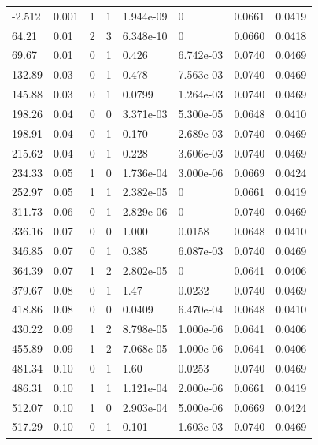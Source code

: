 \documentclass[preview]{standalone}
\begin{document}
{{\begin{tabular}{L{1.2cm}C{1.2cm} C{0.3cm}C{0.5cm} C{1.4cm}C{1.4cm} C{1.4cm}C{1.4cm}}
  -2.512  &  0.001  & 1     &  1 &  1.944e-09  & 0  & 0.0661 &  0.0419   \\ 
  64.21  &  0.01  & 2     &  3 &  6.348e-10  & 0  & 0.0660 &  0.0418   \\ 
  69.67  &  0.01  & 0     &  1 &  0.426  & 6.742e-03  & 0.0740 &  0.0469   \\ 
  132.89  &  0.03  & 0     &  1 &  0.478  & 7.563e-03  & 0.0740 &  0.0469   \\ 
  145.88  &  0.03  & 0     &  1 &  0.0799  & 1.264e-03  & 0.0740 &  0.0469   \\ 
  198.26  &  0.04  & 0     &  0 &  3.371e-03  & 5.300e-05  & 0.0648 &  0.0410   \\ 
  198.91  &  0.04  & 0     &  1 &  0.170  & 2.689e-03  & 0.0740 &  0.0469   \\ 
  215.62  &  0.04  & 0     &  1 &  0.228  & 3.606e-03  & 0.0740 &  0.0469   \\ 
  234.33  &  0.05  & 1     &  0 &  1.736e-04  & 3.000e-06  & 0.0669 &  0.0424   \\ 
  252.97  &  0.05  & 1     &  1 &  2.382e-05  & 0  & 0.0661 &  0.0419   \\ 
  311.73  &  0.06  & 0     &  1 &  2.829e-06  & 0  & 0.0740 &  0.0469   \\ 
  336.16  &  0.07  & 0     &  0 &  1.000  & 0.0158  & 0.0648 &  0.0410   \\ 
  346.85  &  0.07  & 0     &  1 &  0.385  & 6.087e-03  & 0.0740 &  0.0469   \\ 
  364.39  &  0.07  & 1     &  2 &  2.802e-05  & 0  & 0.0641 &  0.0406   \\ 
  379.67  &  0.08  & 0     &  1 &  1.47  & 0.0232  & 0.0740 &  0.0469   \\ 
  418.86  &  0.08  & 0     &  0 &  0.0409  & 6.470e-04  & 0.0648 &  0.0410   \\ 
  430.22  &  0.09  & 1     &  2 &  8.798e-05  & 1.000e-06  & 0.0641 &  0.0406   \\ 
  455.89  &  0.09  & 1     &  2 &  7.068e-05  & 1.000e-06  & 0.0641 &  0.0406   \\ 
  481.34  &  0.10  & 0     &  1 &  1.60  & 0.0253  & 0.0740 &  0.0469   \\ 
  486.31  &  0.10  & 1     &  1 &  1.121e-04  & 2.000e-06  & 0.0661 &  0.0419   \\ 
  512.07  &  0.10  & 1     &  0 &  2.903e-04  & 5.000e-06  & 0.0669 &  0.0424   \\ 
  517.29  &  0.10  & 0     &  1 &  0.101  & 1.603e-03  & 0.0740 &  0.0469   \\ 

\end{tabular}}}
\end{document}
